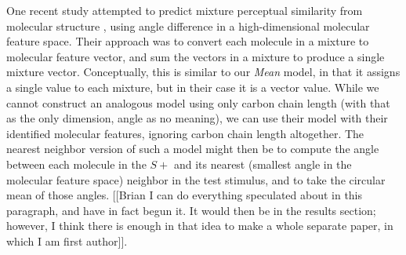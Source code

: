 One recent study attempted to predict mixture perceptual similarity from molecular structure \cite{24068899}, using angle difference in a high-dimensional molecular feature space.  Their approach was to convert each molecule in a mixture to molecular feature vector, and sum the vectors in a mixture to produce a single mixture vector.  Conceptually, this is similar to our \textit{Mean} model, in that it assigns a single value to each mixture, but in their case it is a vector value.  While we cannot construct an analogous model using only carbon chain length (with that as the only dimension, angle as no meaning), we can use their model with their identified molecular features, ignoring carbon chain length altogether.  The nearest neighbor version of such a model might then be to compute the angle between each molecule in the $S+$ and its nearest (smallest angle in the molecular feature space) neighbor in the test stimulus, and to take the circular mean of those angles.  [[Brian I can do everything speculated about in this paragraph, and have in fact begun it. It would then be in the results section; however, I think there is enough in that idea to make a whole separate paper, in which I am first author]].  